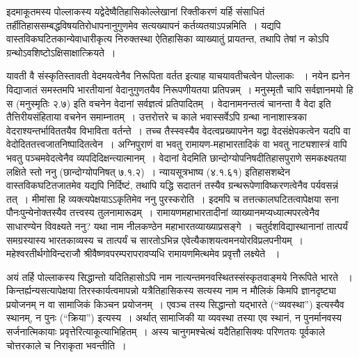 इदमाकूतमस्य पोल्लाकस्य यद्वेदेष्वैतिहासिकोल्लेखानां रिक्तीकरणं यर्हि संसाधितं तर्हीतिहाससम्बद्धविषयतिरोधापनानुगुणमेव सत्यख्यापनं कर्तव्यतयाऽपन्नमिति~। \break यद्यपि वास्तविकघटितकान्येवाधारीकृत्य निरुक्तस्था ऐतिहासिका व्याख्यातुं प्रायतन्त, तथापि तेषां न कोऽपि ग्रन्थोऽवशिष्टोऽक्षिसाक्षात्क्रियते~।

यावती वै संस्कृतिस्तावती वेदमयत्वेनैव निरूपिता वर्तत इत्याह याचयावतीचत्वेन पोल्लाकः ~। नयेन ह्यनेन विद्याजातं समस्तमपि भारतीयानां वेदानुगुणतयैव निरूपणीयतया प्रतिपन्नम्~। मनुस्मृतौ चापि सर्वज्ञानमयो हि स (मनुस्मृतिः २.७) इति वचनेन वेदानां सर्वज्ञत्वं प्रतिपादितम्~। वेदानामनन्तत्वं चानन्ता वै वेदा इति तैत्तिरीयसंहिताया वचनेन  समाम्नातम्~। उत्तरोत्तरे च काले भवास्सर्वेऽपि ग्रन्था नानाशास्त्रका वेदराश्यन्तर्भाविततयैव विभाविता वर्तन्ते~। तच्च तैस्स्वस्यैव वेदत्वप्रख्यापनेन यद्वा वेदसंक्षेपकत्वेन यदपि वा वेदोदिततत्त्वजातनिष्पादितत्वेन~। अग्निपुराणं वा भवतु रामायण-महाभारतादिकं वा भवतु नाट्यशास्त्रं वापि भवतु पञ्चमवेदत्वेनैव व्यपदिदिक्षन्त्यात्मानम्~। वेदानां वेदमिति छान्दोग्योपनिषदीतिहासपुराणे समकक्ष्यतया लक्षिते स्तो ननु (छान्दोग्योपनिषत् ७.१.२)~। न्यायसूत्रभाष्य (४.१.६१) इतिहासशब्देन वास्तविकघटितजातमेव यद्यपि निर्दिष्टं, तथापि यद्धि सदातनं तस्यैव ग्रन्थरूपेणाविष्करणत्वेनैव पर्यवसन्नं तत्~। मीमांसा हि व्यक्त्यपेक्षयाऽऽकृतिमेव ननु पुरस्करोति~। इदमपि च तत्तत्कालघटितत्वापेक्षया सना पौनःपुन्येनोक्तस्यैव तत्त्वस्य तुलनामारूढम्~। रामायणमहाभारतादीनां व्याख्यानमप्यध्यात्मपरत्वेनैव साधारण्येन विवक्ष्यते ननु? यथा नाम नीलकण्ठेन महाभारतव्याख्याप्रसङ्गे~। चतुर्दशविद्यास्थानानां तात्पर्यं समग्रस्यास्य भारतकाव्यस्य च तात्पर्यं च सारतोऽभिन्न एवेत्यैकाशयत्वमनयोरविप्रलपनीयम्~। महेश्वरतीर्थगोविन्दराजौ श्रीवैष्णवपरम्परापरावप्यधि रामायणमित्थमेव प्रवृत्तौ लक्ष्येते ~।

अयं तर्हि पोल्लाकस्य सिद्धान्तो यदितिहासोऽपि नाम नात्यन्तमनवस्थितस्संस्कृतवाङ्मये निरूपिते भारते ~। किन्तर्ह्यन्यसत्यापेक्षया तिरस्कार्यत्वमापन्नो यत्रैतिहासिकस्य सत्यस्य नाम न मौलिकं किमपि ज्ञानदृष्ट्या प्रयोजनम् न वा सामाजिकं किञ्चन प्रयोजनम्~। एवञ्च तस्य सिद्धान्तो यद्भारते  (“व्यवस्था”) इत्यस्यैव स्थानम्, न पुनः (“क्रिया”) इत्यस्य~। अर्थात् सामाजिकी या व्यवस्था तस्या एव स्थानं, न पुनर्मानवस्य सर्जनात्मिकायाः प्रवृत्तेरित्याकूत्याभिहितम्~। अस्य चानुगमश्चेत्थं यदैतिहासिक्यः परिणतयः  पूर्वकाले चोत्तरकाले च निराकृता भवन्तीति~।

